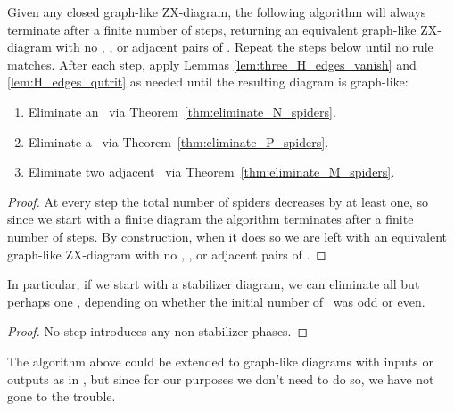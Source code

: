 \begin{theorem}\label{thm:simplification_algorithm_works}
	Given any closed graph-like ZX-diagram, the following algorithm will always terminate after a finite number of steps, returning an equivalent graph-like ZX-diagram with no \Nspiders, \Pspiders, or adjacent pairs of \Mspiders. Repeat the steps below until no rule matches. After each step, apply Lemmas \ref{lem:three_H_edges_vanish} and \ref{lem:H_edges_qutrit} as needed until the resulting diagram is graph-like:
	\begin{enumerate}
		\item Eliminate an \Nspider\ via Theorem~\ref{thm:eliminate_N_spiders}.
		\item Eliminate a \Pspider\ via Theorem~\ref{thm:eliminate_P_spiders}.
		\item Eliminate two adjacent \Mspiders\ via Theorem~\ref{thm:eliminate_M_spiders}.
	\end{enumerate}
	\begin{proof}
		At every step the total number of spiders decreases by at least one, so since we start with a finite diagram the algorithm terminates after a finite number of steps. By construction, when it does so we are left with an equivalent graph-like ZX-diagram with no \Nspiders, \Pspiders, or adjacent pairs of \Mspiders.
	\end{proof}
\end{theorem}

\begin{corollary}\label{cor:stabilizer_simplification_algorithm_works}
	In particular, if we start with a stabilizer diagram, we can eliminate all but perhaps one \Mspider, depending on whether the initial number of \Mspiders\ was odd or even. 
	\begin{proof}
		No step introduces any non-stabilizer phases.
	\end{proof}
\end{corollary}

The algorithm above could be extended to graph-like diagrams with inputs or outputs as in \cite[][Theorem 5.4]{graph_theoretic_simplification}, but since for our purposes we don't need to do so, we have not gone to the trouble.